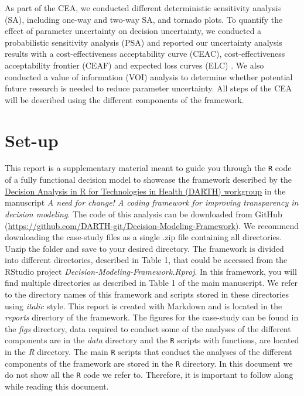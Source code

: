\documentclass[]{book}
\begin{document}
As part of the CEA, we conducted different deterministic sensitivity
analysis (SA), including one-way and two-way SA, and tornado plots. To
quantify the effect of parameter uncertainty on decision uncertainty, we
conducted a probabilistic sensitivity analysis (PSA) and reported our
uncertainty analysis results with a cost-effectiveness acceptability
curve (CEAC), cost-effectiveness acceptability frontier (CEAF) and
expected loss curves (ELC) \citep{Alarid-Escudero2019}. We also
conducted a value of information (VOI) analysis to determine whether
potential future research is needed to reduce parameter uncertainty. All
steps of the CEA will be described using the different components of the
framework.

\section*{Set-up}\label{set-up}

This report is a supplementary material meant to guide you through the
\texttt{R} code of a fully functional decision model to showcase the
framework described by the \href{http://darthworkgroup.com/}{Decision
Analysis in R for Technologies in Health (DARTH) workgroup} in the
manuscript \emph{A need for change! A coding framework for improving
transparency in decision modeling}. The code of this analysis can be
downloaded from GitHub
(\url{https://github.com/DARTH-git/Decision-Modeling-Framework}). We
recommend downloading the case-study files as a single .zip file
containing all directories. Unzip the folder and save to your desired
directory. The framework is divided into different directories,
described in Table 1, that could be accessed from the RStudio project
\emph{Decision-Modeling-Framework.Rproj}. In this framework, you will
find multiple directories as described in Table 1 of the main
manuscript. We refer to the directory names of this framework and
scripts stored in these directories using \emph{italic} style. This
report is created with Markdown and is located in the \emph{reports}
directory of the framework. The figures for the case-study can be found
in the \emph{figs} directory, data required to conduct some of the
analyses of the different components are in the \emph{data} directory
and the \texttt{R} scripts with functions, are located in the \emph{R}
directory. The main \texttt{R} scripts that conduct the analyses of the
different components of the framework are stored in the \texttt{R}
directory. In this document we do not show all the \texttt{R} code we
refer to. Therefore, it is important to follow along while reading this
document.
\end{document}
